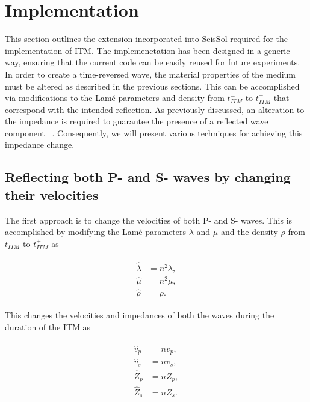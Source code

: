 \section{Implementation}\label{section:Implementation}

This section outlines the extension incorporated into SeisSol required for the implementation of \ac{ITM}. The implemenetation has been designed in a generic way,
ensuring that the current code can be easily reused for future experiments. \\

In order to create a time-reversed wave, the material properties of the medium must be altered as described in the previous sections. This can be accomplished via
modifications to the Lam\'{e} parameters and density from $t_{ITM}^-$ to $t_{ITM}^+$ that correspond with the intended reflection. As previously discussed, an alteration
to the impedance is required to guarantee the presence of a reflected wave component ~\parencite[Sec 9.8]{leveque_2002}. Consequently, we will present various techniques
for achieving this impedance change. \\

\subsection{Reflecting both P- and S- waves by changing their velocities}

The first approach is to change the velocities of both P- and S- waves. This is accomplished by modifying the Lam\'{e} parameters $\lambda$ and $\mu$ and the density $\rho$ from $t_{ITM}^-$ to $t_{ITM}^+$ as

\begin{align}
    \begin{split}
        \hat{\lambda} &= n^2 \lambda , \\
        \hat{\mu} &= n^2 \mu ,\\
        \hat{\rho} &= \rho .
    \end{split}
\end{align}

This changes the velocities and impedances of both the waves during the duration of the \ac{ITM} as

\begin{align}
    \begin{split}
        \hat{v}_p &= n v_p ,\\
        \hat{v}_s &= n v_s ,\\
        \hat{Z}_p &= n Z_p ,\\
        \hat{Z}_s &= n Z_s .
    \end{split}
\end{align}

